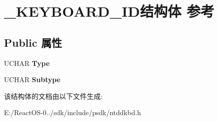 \hypertarget{struct___k_e_y_b_o_a_r_d___i_d}{}\section{\+\_\+\+K\+E\+Y\+B\+O\+A\+R\+D\+\_\+\+I\+D结构体 参考}
\label{struct___k_e_y_b_o_a_r_d___i_d}
\subsection*{Public 属性}
\begin{DoxyCompactItemize}
\item 
\mbox{\label{struct___k_e_y_b_o_a_r_d___i_d_af37df7b349f7765f064605f774bf9d61}} 
U\+C\+H\+AR {\bfseries Type}
\item 
\mbox{\label{struct___k_e_y_b_o_a_r_d___i_d_aeda1b785e3398cb1919beb515c6a7345}} 
U\+C\+H\+AR {\bfseries Subtype}
\end{DoxyCompactItemize}


该结构体的文档由以下文件生成\+:\begin{DoxyCompactItemize}
\item 
E\+:/\+React\+O\+S-\/0../sdk/include/psdk/ntddkbd.\+h\end{DoxyCompactItemize}
